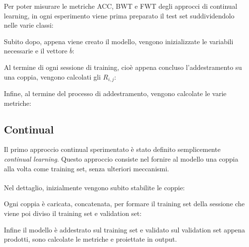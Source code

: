 Per poter misurare le metriche ACC, BWT e FWT degli approcci di continual learning, in ogni esperimento viene prima preparato il test set suddividendolo nelle varie classi:


Subito dopo, appena viene creato il modello, vengono inizializzate le variabili necessarie e il vettore $\overline{b}$:

Al termine di ogni sessione di training, cioè appena concluso l'addestramento su una coppia, vengono calcolati gli $R_{i,j}$:

Infine, al termine del processo di addestramento, vengono calcolate le varie metriche:


\subsection{Continual}
Il primo approccio continual sperimentato è stato definito semplicemente \textit{continual learning}. Questo approccio consiste nel fornire al modello una coppia alla volta come training set, senza ulteriori meccanismi.\\\\
Nel dettaglio, inizialmente vengono subito stabilite le coppie:

Ogni coppia è caricata, concatenata, per formare il training set della sessione che viene poi diviso il training set e validation set:



Infine il modello è addestrato sul training set e validato sul validation set appena prodotti, sono calcolate le metriche e proiettate in output.
